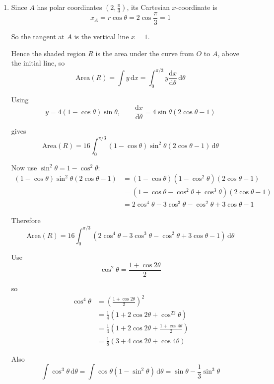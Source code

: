 \documentclass[leqno]{article}
\begin{document}
\begin{enumerate}[
  label=\textbf{\arabic*.},
  leftmargin=*,
  topsep=0pt,
  partopsep=0pt,
  parsep=0pt
]
\begin{djsSolution}
\begin{enumerate}[label=\textbf{(\alph*)}]
Therefore the polar coordinates of \(A\) are
\[
\left(2,\frac{\pi}{3}\right)
\]

  \item Since \(A\) has polar coordinates \(\left(2,\frac{\pi}{3}\right)\), its Cartesian \(x\)-coordinate is
\[
x_A=r\cos\theta=2\cos\frac{\pi}{3}=1
\]

So the tangent at \(A\) is the vertical line \(x=1\).

Hence the shaded region \(R\) is the area under the curve from \(O\) to \(A\), above the initial line, so
\[
\text{Area}(R)=\int y\,\mathrm{d}x
=
\int_0^{\pi/3} y\frac{\mathrm{d}x}{\mathrm{d}\theta}\,\mathrm{d}\theta
\]

Using
\[
y=4(1-\cos\theta)\sin\theta,
\qquad
\frac{\mathrm{d}x}{\mathrm{d}\theta}=4\sin\theta(2\cos\theta-1)
\]

gives
\[
\text{Area}(R)
=
16\int_0^{\pi/3}(1-\cos\theta)\sin^2\theta(2\cos\theta-1)\,\mathrm{d}\theta
\]

Now use \(\sin^2\theta=1-\cos^2\theta\):
\begin{align*}
(1-\cos\theta)\sin^2\theta(2\cos\theta-1)
&=(1-\cos\theta)(1-\cos^2\theta)(2\cos\theta-1) \\
&=(1-\cos\theta-\cos^2\theta+\cos^3\theta)(2\cos\theta-1) \\
&=2\cos^4\theta-3\cos^3\theta-\cos^2\theta+3\cos\theta-1
\end{align*}

Therefore
\[
\text{Area}(R)
=
16\int_0^{\pi/3}
\left(
2\cos^4\theta-3\cos^3\theta-\cos^2\theta+3\cos\theta-1
\right)\,\mathrm{d}\theta
\]

Use
\[
\cos^2\theta=\frac{1+\cos2\theta}{2}
\]

so
\begin{align*}
\cos^4\theta
&=\left(\frac{1+\cos2\theta}{2}\right)^2 \\
&=\frac14\left(1+2\cos2\theta+\cos^22\theta\right) \\
&=\frac14\left(1+2\cos2\theta+\frac{1+\cos4\theta}{2}\right) \\
&=\frac18(3+4\cos2\theta+\cos4\theta)
\end{align*}

Also
\[
\int \cos^3\theta\,\mathrm{d}\theta
=
\int \cos\theta(1-\sin^2\theta)\,\mathrm{d}\theta
=
\sin\theta-\frac13\sin^3\theta
\]


\end{enumerate}
\end{djsSolution}
\end{enumerate}
\end{document}
